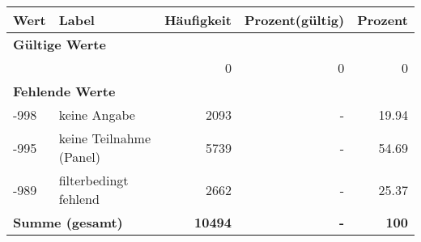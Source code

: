      \begin{longtable}{lXrrr}
     \toprule
     \textbf{Wert} & \textbf{Label} & \textbf{Häufigkeit} & \textbf{Prozent(gültig)} & \textbf{Prozent} \\
     \endhead
     \midrule
     \multicolumn{5}{l}{\textbf{Gültige Werte}}\\
      & & \num{0} & \num{0} & \num{0} \\
     \midrule
     \multicolumn{5}{l}{\textbf{Fehlende Werte}}\\
       -998 &
       keine Angabe &
         \num{2093} &
        - &
         \num[round-mode=places,round-precision=2]{19.94} \\
       -995 &
       keine Teilnahme (Panel) &
         \num{5739} &
        - &
         \num[round-mode=places,round-precision=2]{54.69} \\
       -989 &
       filterbedingt fehlend &
         \num{2662} &
        - &
         \num[round-mode=places,round-precision=2]{25.37} \\
     \midrule
     \multicolumn{2}{l}{\textbf{Summe (gesamt)}} &
          \textbf{\num{10494}} &
        \textbf{-} &
        \textbf{\num{100}} \\
     \bottomrule
     \end{longtable}
     
